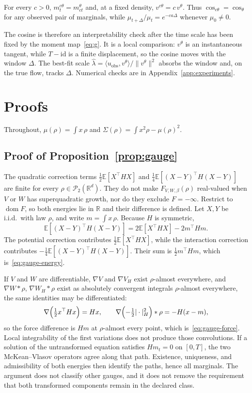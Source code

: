 \documentclass[anon,11pt]{alt2027}
\providecommand{\qed}{\hfill\BlackBox}
\newcommand{\R}{\mathbb{R}}
\newcommand{\Ptwo}{\mathcal{P}_2}
\begin{document}
\begin{proposition}
\label{prop:blind}
For every $c>0$, $m^{c\theta}_t=m^\theta_{ct}$ and, at a fixed density,
$v^{c\theta}=c\,v^\theta$. Thus $\cos_{c\theta}=\cos_\theta$ for any observed
pair of marginals, while $\mu_{t+\Delta}/\mu_t=e^{-ca\Delta}$ whenever
$\mu_0\neq 0$.
\end{proposition}

The cosine is therefore an interpretability check after the time scale has been
fixed by the moment map~\eqref{eq:g}. It is a local comparison: $v^\theta$ is an
instantaneous tangent, while $T-\mathrm{id}$ is a finite displacement, so the
cosine moves with the window $\Delta$. The best-fit scale
$\hat\lambda=\langle u_{\mathrm{obs}},v^\theta\rangle/\|v^\theta\|^2$ absorbs
the window and, on the true flow, tracks $\Delta$. Numerical checks are in
Appendix~\ref{app:experiments}.

\section{Proofs}
\label{app:proofs}

Throughout, $\mu(\rho)=\int x\,\rho$ and
$\Sigma(\rho)=\int x^2\rho-\mu(\rho)^2$.

\subsection{Proof of Proposition~\ref{prop:gauge}}

The quadratic correction terms $\frac12\mathbb E[X^\top HX]$ and
$\frac14\mathbb E[(X-Y)^\top H(X-Y)]$ are finite for every
$\rho\in\Ptwo(\R^d)$. They do not make $F_{V,W,\beta}(\rho)$ real-valued when $V$
or $W$ has superquadratic growth, nor do they exclude $F=-\infty$. Restrict to
$\operatorname{dom} F$, so both energies lie in $\mathbb R$ and their difference
is defined. Let $X,Y$ be i.i.d.\ with law $\rho$, and write $m=\int x\,\rho$.
Because $H$ is symmetric,
\[
\mathbb E[(X-Y)^\top H(X-Y)]
=
2\mathbb E[X^\top HX]-2m^\top Hm.
\]
The potential correction contributes $\frac12\mathbb E[X^\top HX]$, while the
interaction correction contributes
$-\frac14\mathbb E[(X-Y)^\top H(X-Y)]$. Their sum is $\frac12 m^\top Hm$,
which is~\eqref{eq:gauge-energy}.

If $V$ and $W$ are differentiable, $\nabla V$ and $\nabla V_H$ exist
$\rho$-almost everywhere, and $\nabla W*\rho$, $\nabla W_H*\rho$ exist as
absolutely convergent integrals $\rho$-almost everywhere, the same identities
may be differentiated:
\[
\nabla\Bigl(\tfrac12 x^\top Hx\Bigr)=Hx,
\qquad
\nabla\Bigl(-\tfrac12 |\cdot|_H^2\Bigr)\ast\rho=-H(x-m),
\]
so the force difference is $Hm$ at $\rho$-almost every point, which
is~\eqref{eq:gauge-force}. Local integrability of the first variations does
not produce those convolutions. If a solution
of the untransformed equation satisfies $Hm_t=0$ on $[0,T]$, the two
McKean--Vlasov operators agree along that path. Existence, uniqueness, and
admissibility of both energies then identify the paths, hence all marginals.
The argument does not classify other gauges, and it does not remove the
requirement that both transformed components remain in the declared class.\qed
\end{document}

